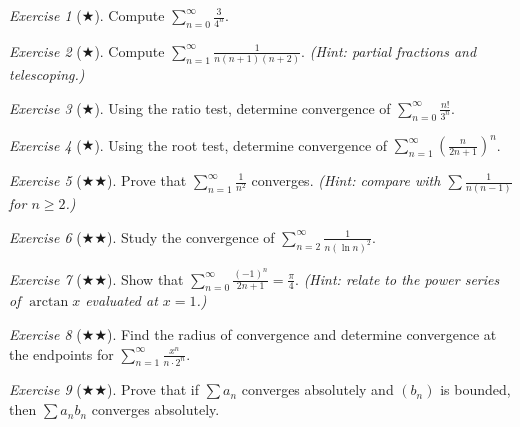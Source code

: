 \documentclass[12pt,a4paper,openany]{book}
\theoremstyle{definition}
\theoremstyle{remark}
\newtheorem{exercise}{Exercise}[chapter]
\begin{document}
\begin{exercise}[$\bigstar$]\label{exo:series2}
Compute $\displaystyle\sum_{n=0}^{\infty}\frac{3}{4^n}$.
\end{exercise}

\begin{exercise}[$\bigstar$]\label{exo:series3}
Compute $\displaystyle\sum_{n=1}^{\infty}\frac{1}{n(n+1)(n+2)}$.
\textit{(Hint: partial fractions and telescoping.)}
\end{exercise}

\begin{exercise}[$\bigstar$]\label{exo:series4}
Using the ratio test, determine convergence of
$\displaystyle\sum_{n=0}^{\infty}\frac{n!}{3^n}$.
\end{exercise}

\begin{exercise}[$\bigstar$]\label{exo:series5}
Using the root test, determine convergence of
$\displaystyle\sum_{n=1}^{\infty}\left(\frac{n}{2n+1}\right)^n$.
\end{exercise}

\begin{exercise}[$\bigstar\bigstar$]\label{exo:series6}
Prove that $\displaystyle\sum_{n=1}^{\infty}\frac{1}{n^2}$ converges.
\textit{(Hint: compare with $\sum\frac{1}{n(n-1)}$ for $n \geq 2$.)}
\end{exercise}

\begin{exercise}[$\bigstar\bigstar$]\label{exo:series7}
Study the convergence of
$\displaystyle\sum_{n=2}^{\infty}\frac{1}{n(\ln n)^2}$.
\end{exercise}

\begin{exercise}[$\bigstar\bigstar$]\label{exo:series8}
Show that $\displaystyle\sum_{n=0}^{\infty}\frac{(-1)^n}{2n+1} = \frac{\pi}{4}$.
\textit{(Hint: relate to the power series of $\arctan x$ evaluated at $x=1$.)}
\end{exercise}

\begin{exercise}[$\bigstar\bigstar$]\label{exo:series9}
Find the radius of convergence and determine convergence at the endpoints for
$\displaystyle\sum_{n=1}^{\infty}\frac{x^n}{n\cdot 2^n}$.
\end{exercise}

\begin{exercise}[$\bigstar\bigstar$]\label{exo:series10}
Prove that if $\sum a_n$ converges absolutely and $(b_n)$ is bounded, then
$\sum a_n b_n$ converges absolutely.
\end{exercise}
\end{document}
